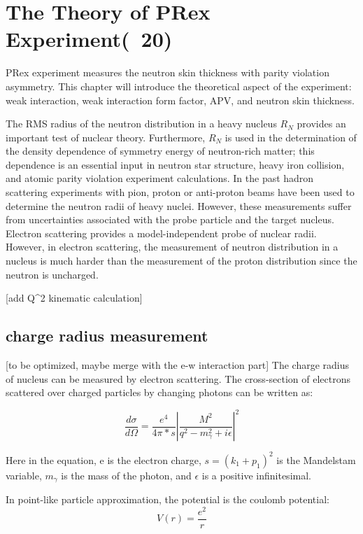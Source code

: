 \chapter{The Theory of PRex Experiment(~20)}

PRex experiment measures the neutron skin thickness with parity violation asymmetry. This chapter will introduce the theoretical aspect of the experiment: weak interaction, weak interaction form factor, APV, and neutron skin thickness.

The RMS radius of the  neutron distribution in a heavy nucleus  $R_N$ provides an important test of nuclear theory. Furthermore,   $R_N$ is used in the determination of  the density dependence of symmetry energy of neutron-rich matter; this dependence is an  essential input in   neutron star structure, heavy iron collision, and atomic parity violation experiment calculations. In the past hadron scattering experiments with pion, proton or anti-proton beams have been used to determine the neutron radii of heavy nuclei. However, these measurements suffer from uncertainties associated with the probe particle and the target nucleus. Electron scattering provides a model-independent probe of nuclear radii.  However, in electron scattering, the measurement of neutron distribution in a nucleus  is much harder than the measurement of the proton distribution  since the neutron is uncharged. 

[add Q^2 kinematic calculation]

\section{charge radius measurement}
[to be optimized, maybe merge with the e-w interaction part]
The charge radius of nucleus can be measured by electron scattering. The cross-section of electrons scattered over charged particles by changing photons can be written as:

\begin{equation}
    \frac{d\sigma}{d\Omega} = \frac{e^4}{4\pi*s}|\frac{M^2}{q^2 - m^2_\gamma + i\epsilon}|^2
\end{equation}

Here in the equation,  e is the electron charge, $s = (k_1 + p_1)^2$ is the Mandelstam variable, $m_\gamma$ is the mass of the photon, and $\epsilon$ is a positive infinitesimal. 

In point-like particle approximation, the potential is the coulomb potential: 
\begin{equation}
    V(r) = \frac{e^2}{r}
\end{equation}

